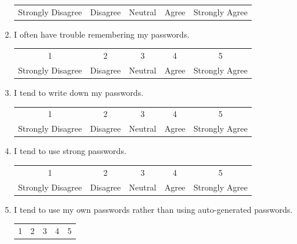 \documentclass[letterpaper, 10 pt, conference]{ieeeconf}  %
\begin{document}
\begin{enumerate}
\begin{table}[!htbp]
\begin{center}
\begin{tabular}{ccccc}
        Strongly Disagree & Disagree & Neutral & Agree & Strongly Agree
        \end{tabular}
        \end{center}
        \end{table}
    \item I often have trouble remembering my passwords.
        \begin{table}[!htbp]
        \begin{center}
        \begin{tabular}{ccccc}
        1                 & 2        & 3       & 4     & 5              \\
        Strongly Disagree & Disagree & Neutral & Agree & Strongly Agree
        \end{tabular}
        \end{center}
        \end{table}
    \item I tend to write down my passwords.
        \begin{table}[!htbp]
        \begin{center}
        \begin{tabular}{ccccc}
        1                 & 2        & 3       & 4     & 5              \\
        Strongly Disagree & Disagree & Neutral & Agree & Strongly Agree
        \end{tabular}
        \end{center}
        \end{table}
    \item I tend to use strong passwords.
        \begin{table}[!htbp]
        \begin{center}
        \begin{tabular}{ccccc}
        1                 & 2        & 3       & 4     & 5              \\
        Strongly Disagree & Disagree & Neutral & Agree & Strongly Agree
        \end{tabular}
        \end{center}
        \end{table}
    \item I tend to use my own passwords rather than using auto-generated passwords.
        \begin{table}[!htbp]
        \begin{center}
        \begin{tabular}{ccccc}
        1                 & 2        & 3       & 4     & 5              \\

\end{tabular}
\end{center}
\end{table}
\end{enumerate}
\end{document}

